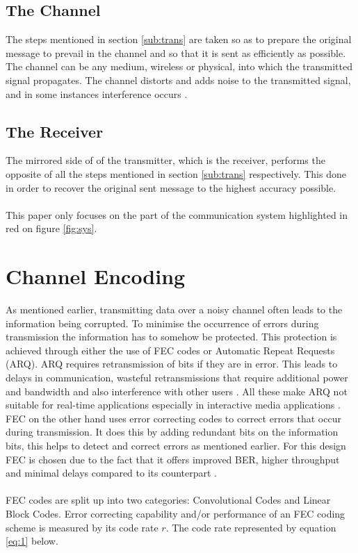 \documentclass[11pt]{report}
\begin{document}
\subsection{The Channel}
The steps mentioned in section \ref{sub:trans} are taken so as to  prepare the original message to prevail in the channel and so that it is sent as efficiently as possible. The channel can be any medium, wireless or physical, into which the transmitted signal propagates. The channel distorts and adds noise to the transmitted signal, and in some instances interference occurs \cite{B10}. 

\subsection{The Receiver}
The mirrored side of of the transmitter, which is the receiver, performs the opposite of all the steps mentioned in section \ref{sub:trans} respectively. This done in order to recover the original sent message to the highest accuracy possible. 
\\
\\
This paper only focuses on the part of the communication system highlighted in red on figure \ref{fig:sys}.

\section{Channel Encoding}
\label{sec:encoding}
As mentioned earlier, transmitting data over a noisy channel often leads to the information being corrupted. To minimise the occurrence of errors during transmission the information has to somehow be protected. This protection is achieved through either the use of FEC codes or Automatic Repeat Requests (ARQ). ARQ requires retransmission of bits if they are in error. This leads to delays in communication, wasteful retransmissions that require additional power and bandwidth and also interference with other users \cite{B11}. All these make ARQ not suitable for real-time applications especially in interactive media applications \cite{51}. FEC on the other hand uses error correcting codes to correct errors that occur during transmission. It does this by adding redundant bits on the information bits, this helps to detect and correct errors as mentioned earlier. For this design FEC is chosen due to the fact that it offers improved BER, higher throughput and minimal delays compared to its counterpart \cite{51,52}.
\\
\\
FEC codes are split up into two categories: Convolutional Codes and Linear Block Codes. Error correcting capability and/or performance of an FEC coding scheme is measured by its code rate $r$. The code rate represented by equation \ref{eq:1} below.
\end{document}
